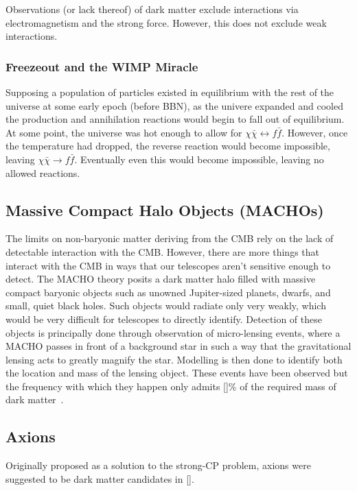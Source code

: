 Observations (or lack thereof) of dark matter exclude interactions via electromagnetism and the strong force. However, this does not exclude weak interactions.

\subsubsection{Freezeout and the WIMP Miracle}

Supposing a population of particles existed in equilibrium with the rest of the universe at some early epoch (before BBN), as the univere expanded and cooled the production and annihilation reactions would begin to fall out of equilibrium. At some point, the universe was hot enough to allow for $\chi \bar{\chi} \leftrightarrow f \bar{f}$. However, once the temperature had dropped, the reverse reaction would become impossible, leaving $\chi \bar{\chi} \rightarrow f \bar{f}$. Eventually even this would become impossible, leaving no allowed reactions.

\subsection{Massive Compact Halo Objects (MACHOs)}

The limits on non-baryonic matter deriving from the CMB rely on the lack of detectable interaction with the CMB. However, there are more things that interact with the CMB in ways that our telescopes aren't sensitive enough to detect. The MACHO theory posits a dark matter halo filled with massive compact baryonic objects such as unowned Jupiter-sized planets, dwarfs, and small, quiet black holes. Such objects would radiate only very weakly, which would be very difficult for telescopes to directly identify. Detection of these objects is principally done through observation of micro-lensing events, where a MACHO passes in front of a background star in such a way that the gravitational lensing acts to greatly magnify the star. Modelling is then done to identify both the location and mass of the lensing object. These events have been observed but the frequency with which they happen only admits []\% of the required mass of dark matter~\cite{}.

\subsection{Axions}

Originally proposed as a solution to the strong-CP problem, axions were suggested to be dark matter candidates in [].

